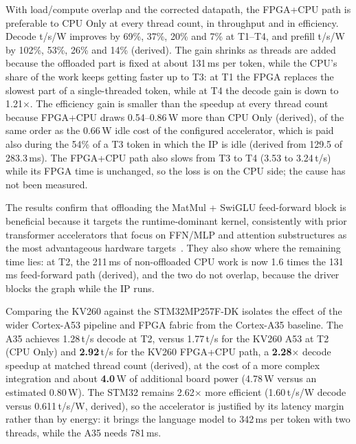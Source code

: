 With load/compute overlap and the corrected datapath, the FPGA+CPU path is preferable
to CPU Only at every thread count, in throughput and in efficiency. Decode t/s/W
improves by 69\%, 37\%, 20\% and 7\% at T1--T4, and prefill t/s/W by 102\%, 53\%, 26\%
and 14\% (derived). The gain shrinks as threads are added because the offloaded part is
fixed at about 131\,ms per token, while the CPU's share of the work keeps getting faster
up to T3: at T1 the FPGA replaces the slowest part of a single-threaded token, while at
T4 the decode gain is down to 1.21$\times$. The efficiency gain is smaller than the
speedup at every thread count because FPGA+CPU draws 0.54--0.86\,W more than CPU Only
(derived), of the same order as the 0.66\,W idle cost of the configured accelerator,
which is paid also during the 54\% of a T3 token in which the IP is idle (derived from
129.5 of 283.3\,ms).
The FPGA+CPU path also slows from T3 to T4 (3.53 to 3.24\,t/s) while its FPGA time is
unchanged, so the loss is on the CPU side; the cause has not been measured.

The results confirm that offloading the MatMul + SwiGLU feed-forward block is beneficial
because it targets the runtime-dominant kernel, consistently with prior transformer
accelerators that focus on FFN/MLP and attention substructures as the most advantageous
hardware targets~\cite{lu2020hw-mha}. They also show where the remaining time lies:
at T2, the 211\,ms of non-offloaded CPU work is now 1.6 times the 131\,ms feed-forward
path (derived), and the two do not overlap, because the driver blocks the graph while the IP runs.

Comparing the KV260 against the STM32MP257F-DK isolates the effect of the wider
Cortex-A53 pipeline and FPGA fabric from the Cortex-A35 baseline. The A35 achieves
1.28\,t/s decode at T2, versus 1.77\,t/s for the KV260 A53 at T2 (CPU Only) and
\textbf{2.92}\,t/s for the KV260 FPGA+CPU path, a \textbf{2.28$\times$} decode speedup
at matched thread count (derived), at the cost of a more complex integration and about
\textbf{4.0}\,W of additional board power (4.78\,W versus an estimated 0.80\,W). The
STM32 remains 2.62$\times$ more efficient (1.60\,t/s/W decode versus 0.611\,t/s/W,
derived), so the accelerator is justified by its latency margin rather than by energy:
it brings the language model to 342\,ms per token with two threads, while the A35 needs
781\,ms.

